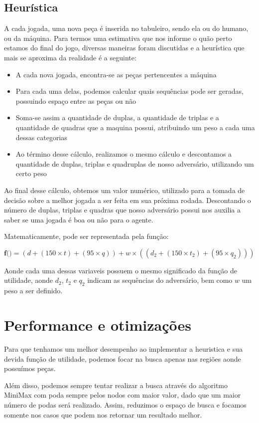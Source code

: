 \documentclass{article}
\begin{document}
  \subsection {Heurística}
    A cada jogada, uma nova peça é inserida no tabuleiro, sendo ela ou do humano, ou da máquina. Para termos uma
    estimativa que nos informe o quão perto estamos do final do jogo, diversas maneiras foram discutidas e a
    heurística que mais se aproxima da realidade é a seguinte:

    \begin{itemize}
      \item A cada nova jogada, encontra-se as peças pertencentes a máquina
      \item Para cada uma delas, podemos calcular quais sequências pode ser geradas, possuindo espaço entre as peças
      ou não
      \item Soma-se assim a quantidade de duplas, a quantidade de triplas e a quantidade de quadras que a maquina
      possui, atribuindo um peso a cada uma dessas categorias
      \item Ao término desse cálculo, realizamos o mesmo cálculo e descontamos a quantidade de duplas, triplas e
      quadruplas de nosso adversário, utilizando um certo peso
    \end{itemize}

    Ao final desse cálculo, obtemos um valor numérico, utilizado para a tomada de decisão sobre a melhor jogada a ser
    feita em sua próxima rodada. Descontando o número de duplas, triplas e quadras que nosso adversário possui nos
    auxilia a saber se uma jogada é boa ou não para o agente.

    Matematicamente, pode ser representada pela função:

    \vspace{.5em}
    $\textbf{f()} = (d + (150 \times t) + (95 \times q)) + w \times ((d_2 + (150 \times t_2) + (95 \times q_2)))$
    \vspace{.5em}

    Aonde cada uma dessas variaveis possuem o mesmo significado da função de utilidade, aonde $d_2$, $t_2$ e $q_2$
    indicam as sequências do adversário, bem como \textbf{$w$} um peso a ser definido.

\section{Performance e otimizações}
  Para que tenhamos um melhor desempenho ao implementar a heuristica e sua devida função de utilidade, podemos
  focar na busca apenas nas regiões aonde possuímos peças.

  Além disso, podemos sempre tentar realizar a busca através do algoritmo MiniMax com poda sempre pelos nodos com
  maior valor, dado que um maior número de podas será realizado. Assim, reduzimos o espaço de busca e focamos
  somente nos casos que podem nos retornar um resultado melhor.
\end{document}
